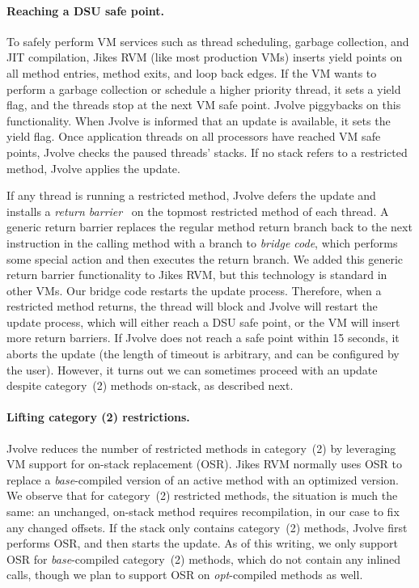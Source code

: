 \documentclass[9pt]{sigplanconf}
\newcommand{\DSU}{{\sc Jvolve}}
\newcommand{\JikesRVM}{Jikes RVM}
\begin{document}
\paragraph{Reaching a DSU safe point.}
To safely perform VM services such as thread scheduling, garbage
collection, and JIT compilation, \JikesRVM{} (like most production
VMs) inserts yield points on all method entries, method exits, and
loop back edges.  If the VM wants to perform a garbage collection or
schedule a higher priority thread, it sets a yield flag, and the
threads stop at the next VM safe point.  
\DSU{} piggybacks on this functionality.  When \DSU{} is informed that an
update is available, it sets the yield flag.  Once application threads
on all processors have reached VM safe points, \DSU{} checks the
paused threads' stacks.  If no stack refers to a restricted
method, \DSU{} applies the update.  

If any thread is running a restricted
method, \DSU{} defers the update and installs a \emph{return
  barrier}~\cite{return-barrier} on the topmost restricted method of each thread.  
A generic return barrier replaces the regular method return branch
back to the next instruction in the calling method with a branch to
\emph{bridge code}, which performs some special action and then
executes the return branch.  We added this generic return barrier
functionality to \JikesRVM\@, but this technology is standard in other
VMs.  Our bridge code restarts the update process.
Therefore, when a restricted method returns,
the thread will block and \DSU{} will restart the update process, which will
either reach a DSU safe 
point, or the VM will insert more return barriers.  If \DSU{} does not reach a safe
point within 15 seconds, it aborts the update (the
length of timeout is arbitrary, and can be configured by the user).
However, it turns out we can sometimes proceed with an update despite
category~(2) methods on-stack, as described next.

\paragraph{Lifting category (2) restrictions.} 
\DSU{} reduces the number of restricted methods in category~(2) by leveraging
VM support for on-stack replacement (OSR).  \JikesRVM{} normally uses OSR to
replace a \emph{base}-compiled version of an active method with an
optimized version.  We observe that for category~(2) restricted
methods, the situation is much the same: an unchanged, on-stack method
requires recompilation, in our case to fix any changed offsets. If the stack only contains category~(2) methods, \DSU{} first performs OSR, and then starts the update.
As of this writing, we only support OSR for \emph{base}-compiled category~(2) methods,
which do not contain any inlined calls, though we plan to support OSR
on \emph{opt}-compiled methods as well.
\end{document}
